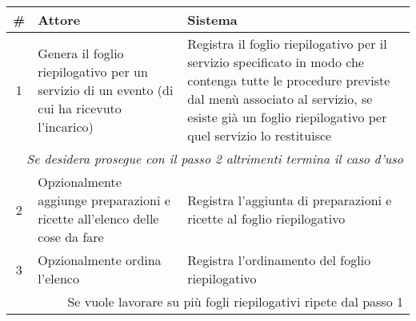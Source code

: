 \begin{table}[H]\centering
    \small
    \begin{tabular}{|c|p{7cm}|p{6.5cm}|}
        \hline\bfseries \# & \bfseries Attore                                                                                                                                              & \bfseries Sistema                                                                                                                                                                                                                       \\\hline
        1                  & Genera il foglio riepilogativo per un servizio di un evento (di cui ha ricevuto l’incarico)                                                                   & Registra il foglio riepilogativo per il servizio specificato in modo che contenga tutte le procedure previste dal menù associato al servizio, se esiste già un foglio riepilogativo per quel servizio lo restituisce \\\hline
        \multicolumn{3}{|r|}{\textit{Se desidera prosegue con il passo 2 altrimenti termina il caso d’uso}}                                                                                                                                                                                                                                                                                                                          \\\hline
        2                  & Opzionalmente aggiunge preparazioni e ricette all’elenco delle cose da fare                                                                                   & Registra l’aggiunta di preparazioni e ricette al foglio riepilogativo                                                                                                                                                                   \\\hline
        3                  & Opzionalmente ordina l’elenco                                                                                                                                 & Registra l’ordinamento del foglio riepilogativo                                                                                                                                                                                         \\\hline
        \multicolumn{3}{|r|}{Se vuole lavorare su più fogli riepilogativi ripete dal passo 1}                                                                                                                                                                                                                                                                                                                                        \\

\end{tabular}
\end{table}
